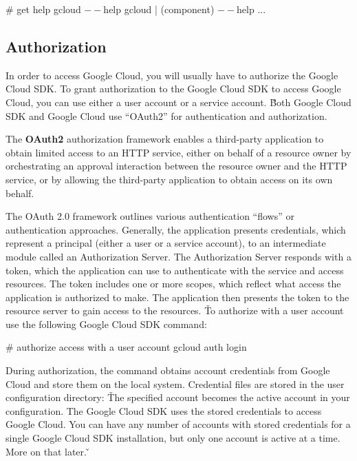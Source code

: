\begin{bash}
# get help
gcloud $--$help
gcloud | (component) $--$help
...
\end{bash}

\subsection{Authorization}

In order to access Google Cloud, you will usually have to authorize the Google Cloud SDK. To grant authorization to
the Google Cloud SDK to access Google Cloud, you can use either a user account or a service account. \v

Both Google Cloud SDK and Google Cloud use ``OAuth2'' for authentication and authorization.

\bd[OAuth2]
The \textbf{OAuth2} authorization framework enables a third-party application to obtain limited access to an HTTP service,
either on behalf of a resource owner by orchestrating an approval interaction between the resource owner and the HTTP
service, or by allowing the third-party application to obtain access on its own behalf.
\ed

The OAuth 2.0 framework outlines various authentication ``flows'' or authentication approaches. Generally, the
application presents credentials, which represent a principal (either a user or a service account), to an
intermediate module called an Authorization Server. The Authorization Server responds with a token, which the
application can use to authenticate with the service and access resources. The token includes one or more scopes,
which reflect what access the application is authorized to make. The application then presents the token to the
resource server to gain access to the resources. \v

To authorize with a user account use the following Google Cloud SDK command:
\begin{bash}
# authorize access with a user account
gcloud auth login
\end{bash}

During authorization, the command obtains account credentials from Google Cloud and store them on the local system.
Credential files are stored in the user configuration directory:  \v

The specified account becomes the active account in your configuration. The Google Cloud SDK uses the stored credentials
to access Google Cloud. You can have any number of accounts with stored credentials for a single Google Cloud SDK
installation, but only one account is active at a time. More on that later. \v

